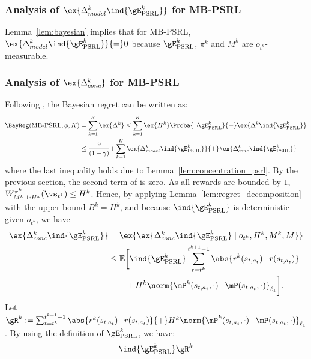 \begin{subappendices}
\subsubsection{Analysis of $\ex{\Delta_{model}^k \ind{\gE^{k}_\text{PSRL}}}$ for MB-PSRL}

Lemma~\ref{lem:bayesian} implies that for MB-PSRL, $\ex{\Delta_{model}^k \ind{\gE^{k}_\text{PSRL}}}{=}0$ because
$\gE^{k}_\text{PSRL}$, $\pi^k$ and $M^k$ are $o_{t^k}$-measurable. 

\subsubsection{Analysis of $\ex{\Delta_{conc}^k}$ for MB-PSRL}
Following , the Bayesian regret can be written as:
\begin{align}
    \BayReg(\textnormal{MB-PSRL},\phi,K)
    &= \sum_{k=1}^K \ex{\Delta^k} \le \sum_{k=1}^{K}\ex{H^k}\Proba{\neg \gE_\text{PSRL}^{k}} {+}\ex{\Delta^k \ind{\gE_\text{PSRL}^{k}}} \nonumber \\
    &\le \frac{9}{(1-\gamma)} {+} \sum_{k=1}^{K} \ex{\Delta_{model}^k\ind{\gE_\text{PSRL}^{k}}} {+} \ex{\Delta_{conc}^k\ind{\gE_\text{PSRL}^{k}}}
    \label{eq:proof_PSRL_regret}
\end{align}
where the last inequality holds due to Lemma~\ref{lem:concentration_psrl}.
By the previous section, the second term of  is zero.
As all rewards are bounded by $1$, $W_{M^k,1:H^k}^{\pi^k}(\vs_{t^k})\le H^k$. Hence, by applying Lemma~\ref{lem:regret_decomposition} with the upper bound $B^k=H^k$, and because $\ind{\gE^{k}_\text{PSRL}}$ is deterministic given $o_{t^k}$, we have
\begin{align}
    \ex{\Delta^k_{conc} \ind{\gE^{k}_\text{PSRL}}}
    &= \ex{\ex{\Delta^k_{conc} \ind{\gE^{k}_\text{PSRL}} \mid o_{t^k}, H^k, M^k, M}} \nonumber \\
    &\le \mathbb{E}\bigg[ \ind{\gE^{k}_\text{PSRL}} \sum_{t=t^k}^{t^{k+1}-1}\abs{r^k(s_{t,a_t}){-}r(s_{t,a_t})} \nonumber\\
    &\qquad +H^k\norm{\mP^{k}(s_{t,a_t},\cdot){-}\mP(s_{t,a_t},\cdot)}_{\ell_1} \bigg]. \label{eq:conc_with_i}
\end{align}
Let $\gR^k := \sum_{t=t^k}^{t^{k+1}-1}\abs{r^k(s_{t,a_t}){-}r(s_{t,a_t})} {+}H^k\norm{\mP^{k}(s_{t,a_t},\cdot){-}\mP(s_{t,a_t},\cdot)}_{\ell_1}$. 
By using the definition of $\gE^{k}_\text{PSRL}$, we have:
\begin{align}
    \ind{\gE^{k}_\text{PSRL}}\gR^k 

\end{align}
\end{subappendices}
